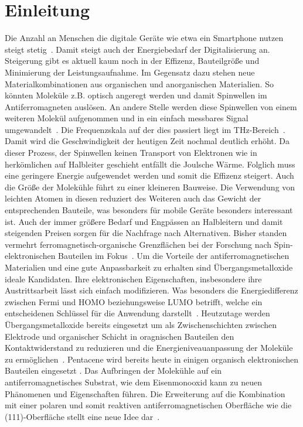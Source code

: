 \chapter{Einleitung}
    Die Anzahl an Menschen die digitale Geräte wie etwa ein Smartphone nutzen steigt stetig~\cite{Statista}.
    Damit steigt auch der Energiebedarf der Digitalisierung an.
    Steigerung gibt es aktuell kaum noch in der Effizenz, Bauteilgröße und Minimierung der Leistungsaufnahme.
    Im Gegensatz dazu stehen neue Materialkombinationen aus organischen und anorganischen Materialien.
    So könnten Moleküle z.B. optisch angeregt werden und damit Spinwellen im Antiferromagneten auslösen. 
    An andere Stelle werden diese Spinwellen von einem weiteren Molekül aufgenommen und in ein einfach messbares Signal umgewandelt~\cite{SINFONIA}.
    Die Frequenzskala auf der dies passiert liegt im \si{\tera\hertz}-Bereich~\cite{bossini_macrospin_2016}.
    Damit wird die Geschwindigkeit der heutigen Zeit nochmal deutlich erhöht.
    Da dieser Prozess, der Spinwellen keinen Transport von Elektronen wie in herkömlichen auf Halbleiter geschieht entfällt die Joulsche Wärme.
    Folglich muss eine geringere Energie aufgewendet werden und somit die Effizenz steigert.
    Auch die Größe der Molekühle führt zu einer kleineren Bauweise.
    Die Verwendung von leichten Atomen in diesen reduziert des Weiteren auch das Gewicht der entsprechenden Bauteile, was besonders für mobile Geräte besonders interessant ist.
    Auch der immer größere Bedarf und Engpässen an Halbleitern \cite{Idealo} und damit steigenden Preisen sorgen für die Nachfrage nach Alternativen.
    Bisher standen vermehrt ferromagnetisch-organische Grenzflächen bei der Forschung nach Spin-elektronischen Bauteilen im Fokus~\cite{ma-DJ}.
    Um die Vorteile der antiferromagnetischen Materialien und eine gute Anpassbarkeit zu erhalten sind Übergangsmetalloxide ideale Kandidaten.
    Ihre elektronischen Eigenschaften, insbesondere ihre Austrittsarbeit lässt sich einfach modifizieren.
    Was besonders die Energiedifferenz zwischen Fermi und HOMO beziehungsweise LUMO betrifft, welche ein entscheidenen Schlüssel für die Anwendung darstellt~\cite{5A_4}.
    Heutzutage werden Übergangsmetalloxide bereits eingesetzt um als Zwischenschichten zwischen Elektrode und organischer Schicht in oragnischen Bauteilen den Kontaktwiderstand zu reduzieren und die Energieniveauanpassung der Moleküle zu ermöglichen~\cite{IF_11}.
    Pentacene wird bereits heute in einigen organisch elektronischen Bauteilen eingesetzt \cite{5A_4}.
    Das Aufbringen der Molekühle auf ein antiferromagnetisches Substrat, wie dem Eisenmonooxid kann zu neuen Phänomenen und Eigenschaften führen.
    Die Erweiterung auf die Kombination mit einer polaren und somit reaktiven antiferromagnetischen Oberfläche wie die  (111)-Oberfläche stellt eine neue Idee dar~\cite{Cappus et al. - 1993 - Hydroxyl groups on oxide surfaces NiO(100), NiO(1.pdf}.


